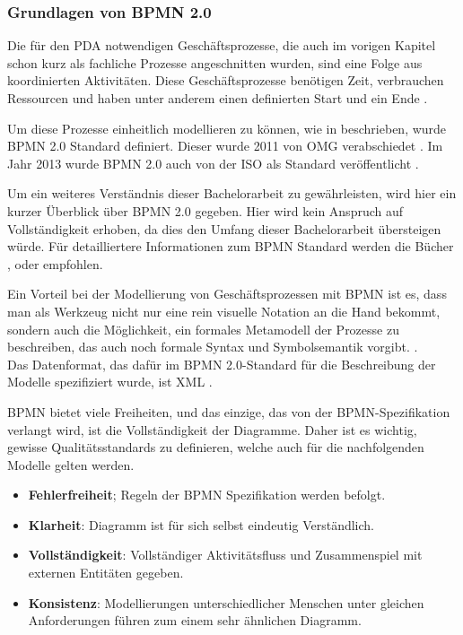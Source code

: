 \subsubsection{Grundlagen von BPMN 2.0}
Die für den \ac{PDA} notwendigen Geschäftsprozesse, die auch im vorigen Kapitel schon kurz als fachliche Prozesse angeschnitten wurden, sind eine Folge aus koordinierten Aktivitäten. Diese Geschäftsprozesse benötigen Zeit, verbrauchen Ressourcen und haben unter anderem einen definierten Start und ein Ende \citep[vgl.][S. 1]{gopfert_geschaftsprozessmodellierung_2013}. 

Um diese Prozesse einheitlich modellieren zu können, wie in  beschrieben, wurde \ac{BPMN} 2.0 Standard definiert. Dieser wurde 2011 von \acl{OMG} verabschiedet \citep[vgl.][S. 8]{freund_praxishandbuch_2017}. Im Jahr 2013 wurde \ac{BPMN} 2.0 auch von der \acl{ISO} als Standard veröffentlicht \citep[vgl.][]{iso_isoiec_2013}.

Um ein weiteres Verständnis dieser Bachelorarbeit zu gewährleisten, wird hier ein kurzer Überblick über \ac{BPMN} 2.0 gegeben. Hier wird kein Anspruch auf Vollständigkeit erhoben, da dies den Umfang dieser Bachelorarbeit übersteigen würde. Für detailliertere Informationen zum \ac{BPMN} Standard werden die Bücher \citep{gopfert_geschaftsprozessmodellierung_2013}, \citep{bruce_bpmn_2012} oder \citep{freund_praxishandbuch_2017} empfohlen.

Ein Vorteil bei der Modellierung von Geschäftsprozessen mit \ac{BPMN} ist es, dass man als Werkzeug nicht nur eine rein visuelle Notation an die Hand bekommt, sondern auch die Möglichkeit, ein formales Metamodell der Prozesse zu beschreiben, das auch noch formale Syntax und Symbolsemantik vorgibt. \citep[vgl.][S. 8]{freund_praxishandbuch_2017}. \\
Das Datenformat, das dafür im \ac{BPMN} 2.0-Standard für die Beschreibung der Modelle spezifiziert wurde, ist \ac{XML} \citep[vgl.][]{object_management_group_about_2010}.

\ac{BPMN} bietet viele Freiheiten, und das einzige, das von der \ac{BPMN}-Spezifikation verlangt wird, ist die Vollständigkeit der Diagramme. Daher ist es wichtig, gewisse Qualitätsstandards zu definieren, welche auch für die nachfolgenden Modelle gelten werden. \citep[vgl.][S. 5]{bruce_bpmn_2012}

\begin{itemize}
    \item \textbf{Fehlerfreiheit}; Regeln der \ac{BPMN} Spezifikation werden befolgt.
    \item \textbf{Klarheit}: Diagramm ist für sich selbst eindeutig Verständlich. \label{enu:item:qualitatsstandards:klarheit}
    \item \textbf{Vollständigkeit}: Vollständiger Aktivitätsfluss und Zusammenspiel mit externen Entitäten gegeben.
    \item \textbf{Konsistenz}: Modellierungen unterschiedlicher Menschen unter gleichen Anforderungen führen zum einem sehr ähnlichen Diagramm.
\end{itemize}
\citep[vgl.][S. 5]{bruce_bpmn_2012}

